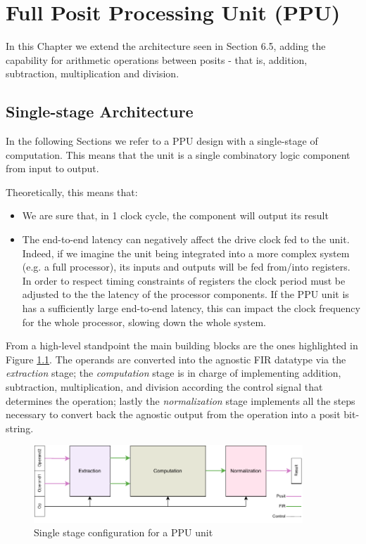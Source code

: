 \chapter{Full Posit Processing Unit (PPU)}

In this Chapter we extend the architecture seen in Section 6.5, adding the capability for arithmetic operations between posits - that is, addition, subtraction, multiplication and division.



\section{Single-stage Architecture}

In the following Sections we refer to a PPU design with a single-stage of computation. This means that the unit is a single combinatory logic component from input to output.

Theoretically, this means that:
\begin{itemize}
    \item We are sure that, in 1 clock cycle, the component will output its result
    \item The end-to-end latency can negatively affect the drive clock fed to the unit. Indeed, if we imagine the unit being integrated into a more complex system (e.g. a full processor), its inputs and outputs will be fed from/into registers. In order to respect timing constraints of registers the clock period must be adjusted to the the latency of the processor components. If the PPU unit is has a sufficiently large end-to-end latency, this can impact the clock frequency for the whole processor, slowing down the whole system.
\end{itemize}

From a high-level standpoint the main building blocks are the ones highlighted in Figure \ref{fig:overview_ppu}.
The operands are converted into the agnostic FIR datatype via the \textit{extraction} stage; the \textit{computation} stage is in charge of implementing addition, subtraction, multiplication, and division according the control signal that determines the operation; lastly the \textit{normalization} stage implements all the steps necessary to convert back the agnostic output from the operation into a posit bit-string.

\begin{figure}
    \begin{center}
    \includegraphics[width=0.9\textwidth]{figures/top.pdf}
    \caption{Single stage configuration for a PPU unit}
    \label{fig:overview_ppu}
    \end{center}
\end{figure}

